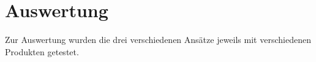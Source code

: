 
\chapter{Auswertung}
\label{ch:auswertung}

Zur Auswertung wurden die drei verschiedenen Ansätze jeweils mit verschiedenen Produkten getestet.

